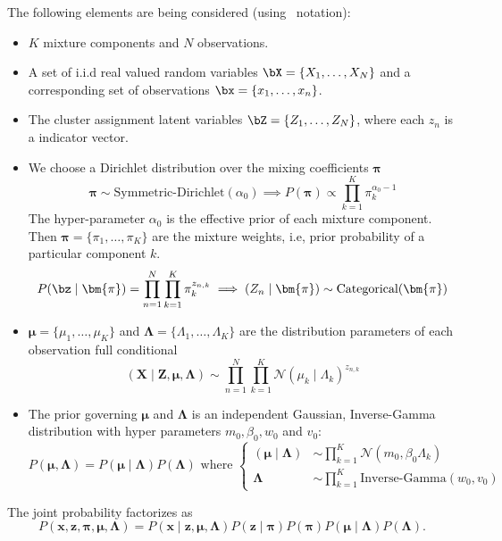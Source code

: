 The following elements are being considered (using~\cite{bishop2006pattern} notation):
\begin{itemize}\setlength\itemsep{1em}
  \item \(K\) mixture components and \(N\) observations.
  \item A set of i.i.d real valued random variables \(\bX = \{X_{1},\dots, X_{N}\}\) and a corresponding set of observations \(\bx = \{x_{1},\dots, x_{n}\}\).
  \item The cluster assignment latent variables \(\bZ = \{Z_{1}, \dots, Z_{N}\}\), where each \(z_{n}\) is a indicator vector.
  \item We choose a Dirichlet distribution over the mixing coefficients \(\bm{\pi}\)
    \[
    \bm{\pi} \sim \text{Symmetric-Dirichlet}(\alpha_{0}) \implies P(\bm{\pi}) \propto \prod_{k=1}^{K}\pi_{k}^{\alpha_{0}-1}
    \]
    The hyper-parameter \(\alpha_{0}\) is the effective prior of each mixture component. Then \(\bm{\pi} = \{\pi_{1},\dots,\pi_{K}\}\) are the mixture weights, i.e, prior probability of a particular component \(k\).
    \[
    P(\bz\mid \bm{\pi}) = \prod_{n=1}^{N}\prod_{k=1}^{K}\pi_{k}^{z_{n,k}} \implies (Z_{n} \mid \bm{\pi}) \sim \text{Categorical}(\bm{\pi})
    \]
  \item \(\bm{\mu} = \{\mu_{1},\dots,\mu_{K}\}\) and \(\bm{\Lambda} = \{\Lambda_{1},\dots,\Lambda_{K}\}\) are the distribution parameters of each observation full conditional
    \[
    (\bm{X} \mid \bm{Z}, \bm{\mu}, \bm{\Lambda}) \sim \prod_{n=1}^{N}\prod_{k=1}^{K}\mathcal{N}(\mu_{k} \mid \Lambda_{k})^{z_{n,k}}
    \]

  \item The prior governing \(\bm{\mu}\) and \(\bm{\Lambda}\) is an independent Gaussian, Inverse-Gamma distribution with hyper parameters \(m_{0}, \beta_{0}, w_{0}\) and \(v_{0}\):
    \[
    P(\bm{\mu}, \bm{\Lambda}) = P(\bm{\mu} \mid \bm{\Lambda})P(\bm{\Lambda}) \text{ where }
    \begin{cases}
      (\bm{\mu}\mid\bm{\Lambda}) &\sim \displaystyle\prod_{k=1}^{K}\mathcal{N}(m_{0}, \beta_{0}\Lambda_{k})\\
      \bm{\Lambda} &\sim \displaystyle\prod_{k=1}^{K}\text{Inverse-Gamma}(w_{0}, v_{0})
      \end{cases}
    \]
\end{itemize}

The joint probability factorizes as
\[
  P(\bm{x}, \bm{z}, \bm{\pi}, \bm{\mu}, \bm{\Lambda}) = P(\bm{x}\mid \bm{z}, \bm{\mu}, \bm{\Lambda})P(\bm{z}\mid \bm{\pi})P(\bm{\pi})P(\bm{\mu}\mid \bm{\Lambda})P(\bm{\Lambda}).
\]

